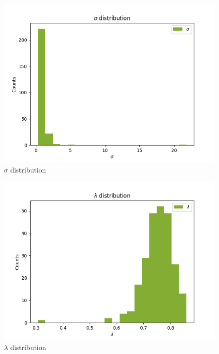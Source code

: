 \documentclass[
]{article}
\begin{document}
\begin{figure}
\centering
\includegraphics{pngplots/param3.png}
\caption{\(\sigma\) distribution}
\end{figure}

\begin{figure}
\centering
\includegraphics{pngplots/param4.png}
\caption{\(\lambda\) distribution}
\end{figure}
\end{document}
